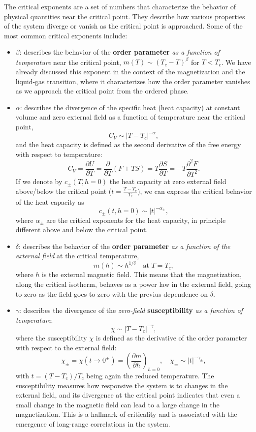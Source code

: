 The critical exponents are a set of numbers that characterize the behavior of physical quantities near the critical point. They describe how various properties of the system diverge or vanish as the critical point is approached. Some of the most common critical exponents include:
\begin{itemize}
    \item $\beta$: describes the behavior of the \textbf{order parameter} \textit{as a function of temperature} near the critical point, $m(T) \sim (T_c - T)^\beta$ for $T < T_c$. We have already discussed this exponent in the context of the magnetization and the liquid-gas transition, where it characterizes how the order parameter vanishes as we approach the critical point from the ordered phase.
    \item $\alpha$: describes the divergence of the specific heat (heat capacity) at constant volume and zero external field as a function of temperature near the critical point,
          \[
              C_V \sim |T - T_c|^{-\alpha},
          \]
          and the heat capacity is defined as the second derivative of the free energy with respect to temperature:
          \[
              C_V = \frac{\partial U}{\partial T} = \frac{\partial}{\partial T} (F + TS) = T \frac{\partial S}{\partial T} = -T \frac{\partial^2 F}{\partial T^2}.
          \]
          If we denote by \(c_\pm(T,h=0)\) the heat capacity at zero external field above/below the critical point (\(t = \tfrac{T-T_c}{T_c}\)), we can express the critical behavior of the heat capacity as
          \[
              c_\pm(t, h=0) \sim |t|^{-\alpha_\pm},
          \]
          where \(\alpha_\pm\) are the critical exponents for the heat capacity, in principle different above and below the critical point.
    \item $\delta$: describes the behavior of the \textbf{order parameter} \textit{as a function of the external field} at the critical temperature,
          \[
              m(h) \sim h^{1/\delta} \quad \text{at } T = T_c,
          \]
          where $h$ is the external magnetic field. This means that the magnetization, along the critical isotherm, behaves as a power law in the external field, going to zero as the field goes to zero with the previus dependence on \(\delta\).
    \item $\gamma$: describes the divergence of the \textit{zero-field} \textbf{susceptibility} \textit{as a function of temperature}:
          \[
              \chi \sim |T - T_c|^{-\gamma},
          \]
          where the susceptibility $\chi$ is defined as the derivative of the order parameter with respect to the external field:
          \[
              \chi_\pm = \chi(t \to 0^{\pm}) = \left(\frac{\partial m}{\partial h}\right)_{h=0}, \quad \chi_\pm \sim |t|^{-\gamma_{\pm}},
          \]
          with $t = (T - T_c)/T_c$ being again the reduced temperature. The susceptibility measures how responsive the system is to changes in the external field, and its divergence at the critical point indicates that even a small change in the magnetic field can lead to a large change in the magnetization. This is a hallmark of criticality and is associated with the emergence of long-range correlations in the system.


\end{itemize}
